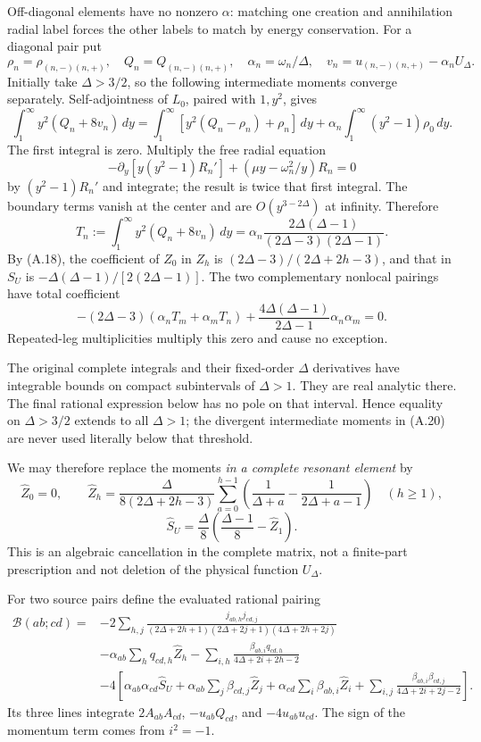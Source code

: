 Off-diagonal elements have no nonzero \(\alpha\): matching one creation and annihilation radial label forces the other labels to match by energy conservation. For a diagonal pair put \[
\rho_n=\rho_{(n,-)(n,+)},\quad Q_n=Q_{(n,-)(n,+)},\quad
\alpha_n=\omega_n/\Delta,\quad v_n=u_{(n,-)(n,+)}-\alpha_nU_\Delta .
\] Initially take \(\Delta>3/2\), so the following intermediate moments converge separately. Self-adjointness of \(L_0\), paired with \(1,y^2\), gives \[
\int_1^\infty y^2(Q_n+8v_n)\,dy
=\int_1^\infty[y^2(Q_n-\rho_n)+\rho_n]\,dy
+\alpha_n\int_1^\infty(y^2-1)\rho_0\,dy .
\tag{A.19}
\] The first integral is zero. Multiply the free radial equation \[
-\partial_y[y(y^2-1)R_n']
+(\mu y-\omega_n^2/y)R_n=0
\] by \((y^2-1)R_n'\) and integrate; the result is twice that first integral. The boundary terms vanish at the center and are \(O(y^{3-2\Delta})\) at infinity. Therefore \[
T_n:=\int_1^\infty y^2(Q_n+8v_n)\,dy
=\alpha_n\frac{2\Delta(\Delta-1)}
{(2\Delta-3)(2\Delta-1)} .
\tag{A.20}
\] By (A.18), the coefficient of \(Z_0\) in \(Z_h\) is \((2\Delta-3)/(2\Delta+2h-3)\), and that in \(S_U\) is \(-\Delta(\Delta-1)/[2(2\Delta-1)]\). The two complementary nonlocal pairings have total coefficient \[
-(2\Delta-3)(\alpha_nT_m+\alpha_mT_n)
+\frac{4\Delta(\Delta-1)}{2\Delta-1}\alpha_n\alpha_m=0.
\tag{A.21}
\] Repeated-leg multiplicities multiply this zero and cause no exception.

The original complete integrals and their fixed-order \(\Delta\) derivatives have integrable bounds on compact subintervals of \(\Delta>1\). They are real analytic there. The final rational expression below has no pole on that interval. Hence equality on \(\Delta>3/2\) extends to all \(\Delta>1\); the divergent intermediate moments in (A.20) are never used literally below that threshold.

We may therefore replace the moments \emph{in a complete resonant element} by \[
\widehat Z_0=0,\qquad
\widehat Z_h=\frac{\Delta}{8(2\Delta+2h-3)}
\sum_{a=0}^{h-1}\left(\frac1{\Delta+a}-\frac1{2\Delta+a-1}\right)
\quad(h\ge1),
\tag{A.22}
\] \[
\widehat S_U=\frac{\Delta}{8}
\left(\frac{\Delta-1}{8}-\widehat Z_1\right).
\] This is an algebraic cancellation in the complete matrix, not a finite-part prescription and not deletion of the physical function \(U_\Delta\).

For two source pairs define the evaluated rational pairing \[
\begin{aligned}
\mathcal B(ab;cd)={}&
-2\sum_{h,j}\frac{j_{ab,h}j_{cd,j}}
{(2\Delta+2h+1)(2\Delta+2j+1)(4\Delta+2h+2j)}\\
&-\alpha_{ab}\sum_hq_{cd,h}\widehat Z_h
-\sum_{i,h}\frac{\beta_{ab,i}q_{cd,h}}
{4\Delta+2i+2h-2}\\
&-4\left[
\alpha_{ab}\alpha_{cd}\widehat S_U
+\alpha_{ab}\sum_j\beta_{cd,j}\widehat Z_j
+\alpha_{cd}\sum_i\beta_{ab,i}\widehat Z_i
+\sum_{i,j}\frac{\beta_{ab,i}\beta_{cd,j}}
{4\Delta+2i+2j-2}
\right].
\end{aligned}
\tag{A.23}
\] Its three lines integrate \(2A_{ab}A_{cd}\), \(-u_{ab}Q_{cd}\), and \(-4u_{ab}u_{cd}\). The sign of the momentum term comes from \(i^2=-1\).

